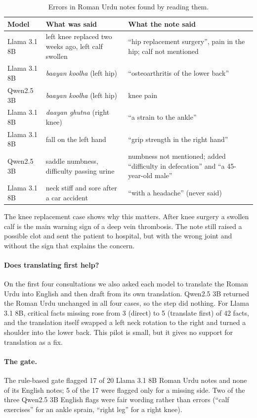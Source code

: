 \documentclass[11pt]{article}
\begin{document}
\begin{table}[t]
\centering
\small
\begin{tabularx}{\linewidth}{lXX}
\toprule
Model & What was said & What the note said\\
\midrule
Llama 3.1 8B & left knee replaced two weeks ago, left calf swollen & ``hip replacement surgery'', pain in the hip; calf not mentioned\\
Llama 3.1 8B & \emph{baayan koolha} (left hip) & ``osteoarthritis of the lower back''\\
Qwen2.5 3B & \emph{baayan koolha} (left hip) & knee pain\\
Llama 3.1 8B & \emph{daayan ghutna} (right knee) & ``a strain to the ankle''\\
Llama 3.1 8B & fall on the left hand & ``grip strength in the right hand''\\
Qwen2.5 3B & saddle numbness, difficulty passing urine & numbness not mentioned; added ``difficulty in defecation'' and ``a 45-year-old male''\\
Llama 3.1 8B & neck stiff and sore after a car accident & ``with a headache'' (never said)\\
\bottomrule
\end{tabularx}
\caption{Errors in Roman Urdu notes found by reading them.}
\label{tab:errors}
\end{table}

The knee replacement case shows why this matters. After knee surgery a swollen calf is the main warning sign of a deep vein thrombosis. The note still raised a possible clot and sent the patient to hospital, but with the wrong joint and without the sign that explains the concern.

\paragraph{Does translating first help?} On the first four consultations we also asked each model to translate the Roman Urdu into English and then draft from its own translation. Qwen2.5 3B returned the Roman Urdu unchanged in all four cases, so the step did nothing. For Llama 3.1 8B, critical facts missing rose from 3 (direct) to 5 (translate first) of 42 facts, and the translation itself swapped a left neck rotation to the right and turned a shoulder into the lower back. This pilot is small, but it gives no support for translation as a fix.

\paragraph{The gate.} The rule-based gate flagged 17 of 20 Llama 3.1 8B Roman Urdu notes and none of its English notes; 5 of the 17 were flagged only for a missing side. Two of the three Qwen2.5 3B English flags were fair wording rather than errors (``calf exercises'' for an ankle sprain, ``right leg'' for a right knee).
\end{document}

